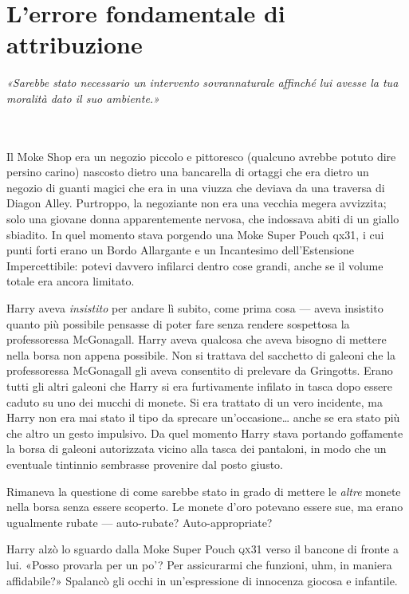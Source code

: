 
\chapter{L’errore fondamentale di attribuzione}
\label{capitolo:5}

\emph{«Sarebbe stato necessario un intervento sovrannaturale affinché lui avesse la tua moralità dato il suo ambiente.»}

~\\
~\\

Il Moke Shop era un negozio piccolo e pittoresco (qualcuno avrebbe potuto dire persino carino) nascosto dietro una bancarella di ortaggi che era dietro un negozio di guanti magici che era in una viuzza che deviava da una traversa di Diagon Alley. Purtroppo, la negoziante non era una vecchia megera avvizzita; solo una giovane donna apparentemente nervosa, che indossava abiti di un giallo sbiadito. In quel momento stava porgendo una Moke Super Pouch qx31, i cui punti forti erano un Bordo Allargante e un Incantesimo dell’Estensione Impercettibile: potevi davvero infilarci dentro cose grandi, anche se il volume totale era ancora limitato.

Harry aveva \textit{insistito} per andare lì subito, come prima cosa — aveva insistito quanto più possibile pensasse di poter fare senza rendere sospettosa la professoressa McGonagall. Harry aveva qualcosa che aveva bisogno di mettere nella borsa non appena possibile. Non si trattava del sacchetto di galeoni che la professoressa McGonagall gli aveva consentito di prelevare da Gringotts. Erano tutti gli altri galeoni che Harry si era furtivamente infilato in tasca dopo essere caduto su uno dei mucchi di monete. Si era trattato di un vero incidente, ma Harry non era mai stato il tipo da sprecare un’occasione… anche se era stato più che altro un gesto impulsivo. Da quel momento Harry stava portando goffamente la borsa di galeoni autorizzata vicino alla tasca dei pantaloni, in modo che un eventuale tintinnio sembrasse provenire dal posto giusto.

Rimaneva la questione di come sarebbe stato in grado di mettere le \textit{altre} monete nella borsa senza essere scoperto. Le monete d’oro potevano essere sue, ma erano ugualmente rubate — auto-rubate? Auto-appropriate?

Harry alzò lo sguardo dalla Moke Super Pouch \textsc{qx}31 verso il bancone di fronte a lui. «Posso provarla per un po’? Per assicurarmi che funzioni, uhm, in maniera affidabile?» Spalancò gli occhi in un’espressione di innocenza giocosa e infantile.

